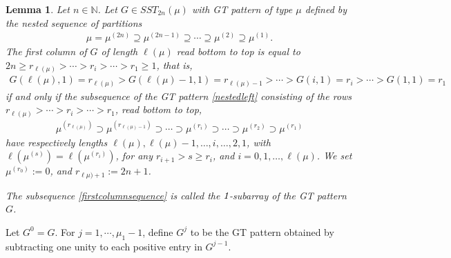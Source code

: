 \documentclass[reqno]{amsart}
\theoremstyle{tplain}
\newtheorem{lem}{Lemma}
\begin{document}
{\begin{lem} \label{lem:leftcomp}Let $n\in\mathbb{N}$. Let $G\in SST_{2n}(\mu)$ with GT pattern of type $\mu$ defined by the nested sequence of partitions
\begin{align}\mu=\mu^{(2n)}\supseteq \mu^{(2n-1)}
\supseteq \cdots \supseteq \mu^{(2)}\supseteq\mu^{(1)}.\label{nestedleft}
\end{align}
The first column of $G$ of length $\ell(\mu)$ read bottom to top is equal to $2n\ge r_{\ell(\mu)}>\cdots>r_i>\cdots >r_1\ge 1$, that is,
\begin{align}G(\ell(\mu),1)=r_{\ell(\mu)}>G(\ell(\mu)-1,1)=r_{\ell(\mu)-1}>\cdots> G(i,1)= r_i >\cdots > G(1,1)=r_1\nonumber\end{align}
if and only if the subsequence of the GT pattern \eqref{nestedleft} consisting of the rows $r_{\ell(\mu)}>\cdots>r_i>\cdots >r_1$, read bottom to top,
 \begin{align}\mu^{(r_{\ell(\mu)})}\supset \mu^{(r_{\ell(\mu)-1})}
\supset \cdots \supset \mu^{(r_i)}\supset\cdots\supset \mu^{(r_2)}\supset\mu^{(r_1)} \label{firstcolumnsequence}
\end{align}
have respectively  lengths  $\ell(\mu), \ell(\mu)-1,\dots, i,\dots,2,1$, with
$\ell(\mu^{(s)})=\ell(\mu^{(r_{i})})$,  for any $r_{i+1}>s\ge  r_{i}$, and  $i=0,1,\dots, \ell(\mu)$.
    We set $\mu^{(r_0)}:=0$, and $r_{\ell{\mu)+1}}:={2n+1}$.

   The subsequence \eqref{firstcolumnsequence} is called the $\emph{1}$-\emph{subarray} of the GT pattern $G$.
 \end{lem}
 Let $G^0=G$.
 For $j=1,\cdots,\mu_1-1$, define $G^j$ to be the GT pattern obtained  by subtracting one unity to  each  positive entry in $G^{j-1}$.

}
\end{document}
